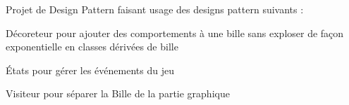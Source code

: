 Projet de Design Pattern faisant usage des designs pattern suivants \+:
\begin{DoxyItemize}
\item Décoreteur pour ajouter des comportements à une bille sans exploser de façon exponentielle en classes dérivées de bille
\item États pour gérer les événements du jeu
\item Visiteur pour séparer la Bille de la partie graphique 
\end{DoxyItemize}